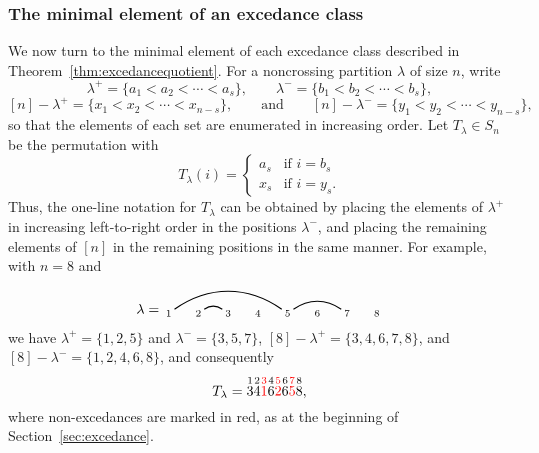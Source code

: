 \documentclass[12pt]{article}
\theoremstyle{definition}
\theoremstyle{remark}
\numberwithin{equation}{section}
\renewcommand{\setminus}{-}
\begin{document}
\subsubsection{The minimal element of an excedance class}
\label{sec:ex2.1}

We now turn to the minimal element of each excedance class described in Theorem~\ref{thm:excedancequotient}.  For a noncrossing partition $\lambda$ of size $n$, write 
\[
\lambda^{+} = \{a_{1} < a_{2} < \cdots < a_{s}\},
\qquad
\lambda^{-} = \{b_{1} < b_{2} < \cdots < b_{s}\},
\]
\[
[n] \setminus \lambda^{+} = \{x_{1} < x_{2} < \cdots < x_{n-s}\},
\qquad\text{and}\qquad
[n] \setminus \lambda^{-} = \{y_{1} < y_{2} < \cdots < y_{n-s}\},
\]
so that the elements of each set are enumerated in increasing order.  Let $T_{\lambda} \in S_{n}$ be the permutation with
\[
T_{\lambda}(i) = \begin{cases} a_{s} & \text{if $i = b_{s}$} \\ x_{s} & \text{if $i = y_{s}$.}  \end{cases}
\]
Thus, the one-line notation for $T_{\lambda}$ can be obtained by placing the elements of $\lambda^{+}$ in increasing left-to-right order in the positions $\lambda^{-}$, and placing the remaining elements of $[n]$ in the remaining positions in the same manner.  For example, with $n = 8$ and 
\[
\lambda = \begin{tikzpicture}[scale = 0.75, baseline = 0.75*-0.2]
\foreach \x in {1, ..., 8}{\draw[fill] (\x - 1, 0) node[inner sep = 2pt] (\x) {$\scriptstyle \x$};}
\foreach \i\j in {1/5, 2/3, 5/7}{\draw[thick] (\i) to[out = 35, in = 145] (\j);}
\end{tikzpicture}
\]
we have $\lambda^{+} = \{1, 2, 5\}$ and $\lambda^{-} = \{3, 5, 7\}$, $[8] \setminus \lambda^{+} = \{3, 4, 6, 7, 8\}$, and $[8] \setminus \lambda^{-} = \{1, 2, 4, 6, 8\}$, and consequently
\[
T_{\lambda} = \overset{1}{3} \overset{2}{4} {\color{red} \overset{3}{1}} \overset{4}{6} {\color{red} \overset{5}{2}} \overset{6}{6} {\color{red} \overset{7}{5}} \overset{8}{8},
\]
where non-excedances are marked in red, as at the beginning of Section~\ref{sec:excedance}.
\end{document}
